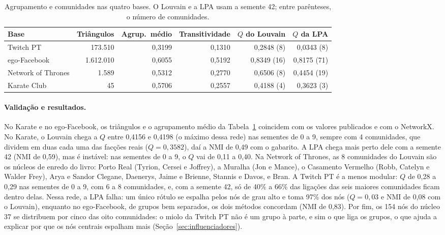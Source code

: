 \begin{table}[htbp]
\centering
\caption{Agrupamento e comunidades nas quatro bases. O Louvain e a LPA usam a semente 42; entre
parênteses, o número de comunidades.}
\label{tab:comunidades}
\small
\setlength{\tabcolsep}{4.5pt}
\begin{tabular}{@{}l r r r r r@{}}
\toprule
Base & Triângulos & Agrup.\ médio & Transitividade & $Q$ do Louvain & $Q$ da LPA \\
\midrule
Twitch PT & 173.510 & 0,3199 & 0,1310 & 0,2848 (8) & 0,0343 (8) \\
ego-Facebook & 1.612.010 & 0,6055 & 0,5192 & 0,8349 (16) & 0,8175 (71) \\
Network of Thrones & 1.589 & 0,5312 & 0,2770 & 0,6506 (8) & 0,4454 (19) \\
Karate Club & 45 & 0,5706 & 0,2557 & 0,4188 (4) & 0,3623 (3) \\
\bottomrule
\end{tabular}
\end{table}

\paragraph{Validação e resultados.} No Karate e no ego-Facebook, os triângulos e o agrupamento médio
da Tabela~\ref{tab:comunidades} coincidem com os valores publicados e com o NetworkX. No Karate, o
Louvain chega a $Q$ entre 0,4156 e 0,4198 (o máximo dessa rede) nas sementes de 0 a 9, sempre com 4
comunidades, que dividem em duas cada uma das facções reais ($Q = 0{,}3582$), daí a NMI de 0,49 com
o gabarito. A LPA chega mais
perto dele com a semente 42 (NMI de 0,59), mas é instável: nas sementes de 0 a 9, o $Q$ vai de 0,11
a 0,40. Na Network of Thrones, as 8 comunidades do Louvain são os núcleos de enredo do livro:
Porto Real (Tyrion, Cersei e Joffrey), a Muralha (Jon e Mance), o Casamento Vermelho (Robb, Catelyn e
Walder Frey), Arya e Sandor Clegane, Daenerys, Jaime e Brienne, Stannis e Davos, e Bran. A Twitch PT é a menos modular: $Q$ de 0,28 a
0,29 nas sementes de 0 a 9, com 6 a 8 comunidades, e, com a semente 42, só de 40\% a 66\% das
ligações das seis maiores comunidades ficam dentro delas. Nessa rede, a LPA falha: um único rótulo se espalha pelos nós de grau alto e toma
97\% dos nós ($Q = 0{,}03$ e NMI de 0,08 com o Louvain), enquanto no ego-Facebook, de grupos bem
separados, os dois métodos concordam (NMI de 0,83). Por fim, os 154 nós do núcleo 37 se distribuem
por cinco das oito comunidades: o miolo da Twitch PT não é um grupo à parte, e sim o que liga os
grupos, o que ajuda a explicar por que os nós centrais espalham mais (Seção~\ref{sec:influenciadores}).
